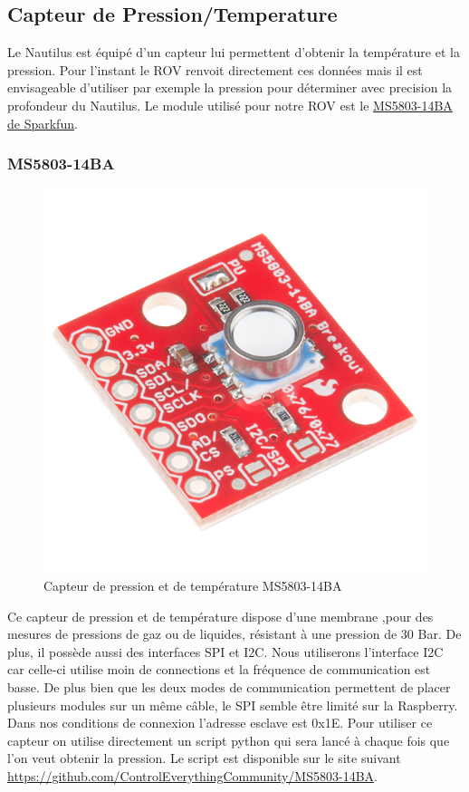 \documentclass[a4paper,11pt]{report}
\begin{document}
		\subsection{Capteur de Pression/Temperature}
		Le Nautilus est équipé d'un capteur lui permettent d'obtenir la température et la pression. Pour l'instant le ROV renvoit directement ces données mais il est envisageable d'utiliser par exemple la pression pour déterminer avec precision la profondeur du Nautilus. Le module utilisé pour notre ROV est le \href{https://www.sparkfun.com/products/12909}{MS5803-14BA de Sparkfun}.\newline
			\subsubsection{MS5803-14BA}\newline
			\begin{figure}[!h]
					\begin{center}
						\includegraphics[scale=1]{Photos/Capture30.jpg}
						\caption{Capteur de pression et de température MS5803-14BA}
					\end{center}
				\end{figure}
				\newline
			Ce capteur de pression et de température dispose d'une membrane ,pour des mesures de pressions de gaz ou de liquides, résistant à une pression de 30 Bar. De plus, il possède aussi des interfaces SPI et I2C. Nous utiliserons l'interface I2C car celle-ci utilise moin de connections et la fréquence de communication est basse. De plus bien que les deux modes de communication permettent de placer plusieurs modules sur un même câble, le SPI semble être limité sur la Raspberry. Dans nos conditions de connexion l'adresse esclave est 0x1E. Pour utiliser ce capteur on utilise directement un script python qui sera lancé à chaque fois que l'on veut obtenir la pression. Le script est disponible sur le site suivant \url{https://github.com/ControlEverythingCommunity/MS5803-14BA}. \newline
\end{document}
